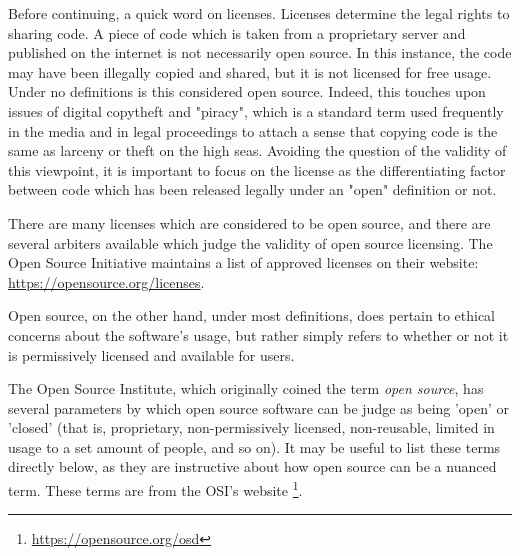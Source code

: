 Before continuing, a quick word on licenses. Licenses determine the legal rights to sharing code. A piece of code which is taken from a proprietary server and published on the internet is not necessarily open source. In this instance, the code may have been illegally copied and shared, but it is not licensed for free usage. Under no definitions is this considered open source. Indeed, this touches upon issues of digital copytheft and "piracy", which is a standard term used frequently in the media and in legal proceedings to attach a sense that copying code is the same as larceny or theft on the high seas. Avoiding the question of the validity of this viewpoint, it is important to focus on the license as the differentiating factor between code which has been released legally under an "open" definition or not.

There are many licenses which are considered to be open source, and there are several arbiters available which judge the validity of open source licensing. The Open Source Initiative maintains a list of approved licenses on their website: \href{https://opensource.org/licenses}{https://opensource.org/licenses}.

Open source, on the other hand, under most definitions, does pertain to ethical concerns about the software's usage, but rather simply refers to whether or not it is permissively licensed and available for users.


The Open Source Institute, which originally coined the term {\it open source}, has several parameters by which open source software can be judge as being 'open' or 'closed' (that is, proprietary, non-permissively licensed, non-reusable, limited in usage to a set amount of people, and so on). It may be useful to list these terms directly below, as they are instructive about how open source can be a nuanced term. These terms are from the OSI's website \footnote{\href{https://opensource.org/osd}{https://opensource.org/osd}}.

